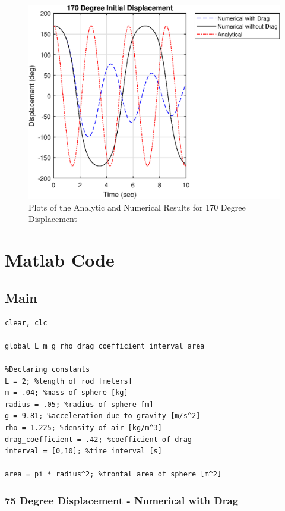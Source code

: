 \documentclass{article}
\begin{document}
\begin{figure}[h]
\centering
\includegraphics[width=1\textwidth]{Pendulum_06.eps}
\caption{Plots of the Analytic and Numerical Results for 170 Degree Displacement}
\label{170}
\end{figure}

\pagebreak
\section{Matlab Code}
\label{Code}

\subsection{Main}

\begin{verbatim}
clear, clc

global L m g rho drag_coefficient interval area

%Declaring constants
L = 2; %length of rod [meters]
m = .04; %mass of sphere [kg]
radius = .05; %radius of sphere [m]
g = 9.81; %acceleration due to gravity [m/s^2]
rho = 1.225; %density of air [kg/m^3]
drag_coefficient = .42; %coefficient of drag
interval = [0,10]; %time interval [s]

area = pi * radius^2; %frontal area of sphere [m^2]
\end{verbatim}


\subsubsection{75 Degree Displacement - Numerical with Drag}
\label{75drag}
\end{document}
